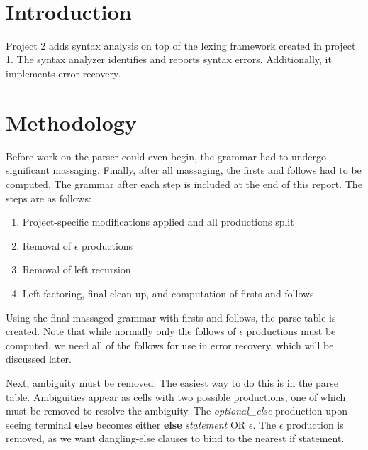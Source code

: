 \documentclass[paper=letter, fontsize=11pt, oneside, titlepage]{scrartcl}
\title{
\vspace{1.8 in} \normalfont \normalsize 
\textsc{\pschool} \\ [25pt] %
\horrule{0.5pt} \\[0.4cm] %
\huge \ptitle \\ %
\horrule{0.5pt} \\[0.5cm] %
}
\author{\pauthor} %
\date{
    \normalsize
    \pteacher \endgraf
    \pclass \endgraf
    \pdate
} %
\begin{document}

\maketitle

\section{Introduction}\label{intro}

Project 2 adds syntax analysis on top of the lexing framework created in project 1.  The syntax analyzer identifies and reports syntax errors.  Additionally, it implements error recovery.  

\section{Methodology}\label{meth}

Before work on the parser could even begin, the grammar had to undergo significant massaging.  Finally, after all massaging, the firsts and follows had to be computed.  The grammar after each step is included at the end of this report.  The steps are as follows: 
\begin{enumerate}
  \item Project-specific modifications applied and all productions split
  \item Removal of $\epsilon$ productions
  \item Removal of left recursion
  \item Left factoring, final clean-up, and computation of firsts and follows
\end{enumerate}

Using the final massaged grammar with firsts and follows, the parse table is created.  Note that while normally only the follows of $\epsilon$ productions must be computed, we need all of the follows for use in error recovery, which will be discussed later.  

Next, ambiguity must be removed.  The easiest way to do this is in the parse table.  Ambiguities appear as cells with two possible productions, one of which must be removed to resolve the ambiguity.  The \textit{optional\_else} production upon seeing terminal \textbf{else} becomes either \textbf{else} \textit{statement} OR \textbf{$\epsilon$}. The $\epsilon$ production is removed, as we want dangling-else clauses to bind to the nearest if statement.  
\end{document}
